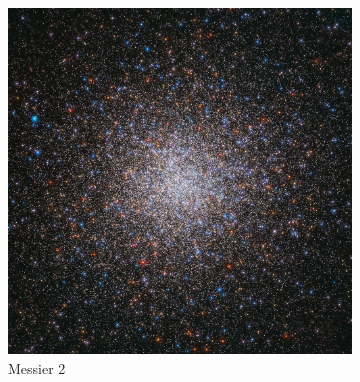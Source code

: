 \documentclass{article}
\begin{document}
	\begin{figure}
		\centering
		\begin{subfigure}[b]{0.2\linewidth}
			\includegraphics[width=\linewidth]{images/messier2.jpg}
			\caption{Messier 2}
		\end{subfigure}
		\begin{subfigure}[b]{0.2\linewidth}

\end{subfigure}
\end{figure}
\end{document}
